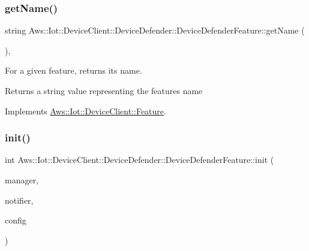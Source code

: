 \subsubsection{\texorpdfstring{get\+Name()}{getName()}}
{\footnotesize\ttfamily string Aws\+::\+Iot\+::\+Device\+Client\+::\+Device\+Defender\+::\+Device\+Defender\+Feature\+::get\+Name (\begin{DoxyParamCaption}{ }\end{DoxyParamCaption})\hspace{0.3cm}{\ttfamily [override]}, {\ttfamily [virtual]}}



For a given feature, returns its name. 

\begin{DoxyReturn}{Returns}
a string value representing the feature\textquotesingle{}s name 
\end{DoxyReturn}


Implements \hyperlink{class_aws_1_1_iot_1_1_device_client_1_1_feature_a7f56b81457898d67ddc1942e57e3c0d5}{Aws\+::\+Iot\+::\+Device\+Client\+::\+Feature}.

\mbox{\label{class_aws_1_1_iot_1_1_device_client_1_1_device_defender_1_1_device_defender_feature_a7fe61ca792baf877da7bbbd00e81629b}} 
\subsubsection{\texorpdfstring{init()}{init()}}
{\footnotesize\ttfamily int Aws\+::\+Iot\+::\+Device\+Client\+::\+Device\+Defender\+::\+Device\+Defender\+Feature\+::init (\begin{DoxyParamCaption}\item[{std\+::shared\+\_\+ptr$<$ \hyperlink{class_aws_1_1_iot_1_1_device_client_1_1_shared_crt_resource_manager}{Shared\+Crt\+Resource\+Manager} $>$}]{manager,  }\item[{std\+::shared\+\_\+ptr$<$ \hyperlink{class_aws_1_1_iot_1_1_device_client_1_1_client_base_notifier}{Client\+Base\+Notifier} $>$}]{notifier,  }\item[{const \hyperlink{struct_aws_1_1_iot_1_1_device_client_1_1_plain_config}{Plain\+Config} \&}]{config }\end{DoxyParamCaption})}



